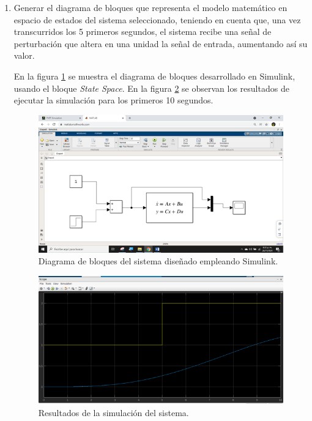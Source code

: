 \documentclass{article}
\begin{document}
\begin{enumerate}
La ecuación mostrada en la figura \ref{fig:ecuacion2} es igual a la obtenida por espacios de estado, por tanto, el desarrollo es correcto, ahora si calculamos el lugar geométrico de las raíces de este sistema nos encontramos que el sistema tiene 2 polos en el semiplano derecho, por tanto, el sistema es inestable. 

\lipsum[1][1-5]

\item Generar el diagrama de bloques que representa el modelo matemático en espacio de estados del sistema seleccionado, teniendo en cuenta que, una vez transcurridos los 5 primeros segundos, el sistema recibe una señal de perturbación que altera en una unidad la señal de entrada, aumentando así su valor.

En la figura \ref{fig:diagramabloques} se muestra el diagrama de bloques desarrollado en Simulink, usando el bloque \emph{State Space}. En la figura \ref{fig:simulacion} se observan los resultados de ejecutar la simulación para los primeros 10 segundos.

\lipsum[1-2] \cite{WOS:000540232900001}

\begin{figure}
  \centering
  \includegraphics[width=14cm]{img/bloques.png}
  \caption{Diagrama de bloques del sistema diseñado empleando Simulink.}
  \label{fig:diagramabloques}
\end{figure}

\begin{figure}
  \centering
  \includegraphics[width=14cm]{img/simulacion.png}
  \caption{Resultados de la simulación del sistema.}
  \label{fig:simulacion}
\end{figure}


\end{enumerate}
\end{document}
